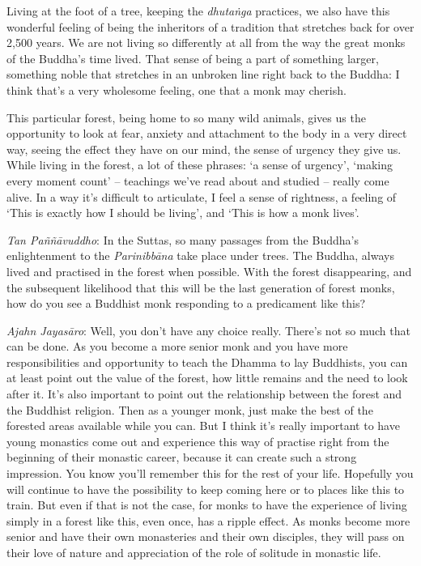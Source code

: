 Living at the foot of a tree, keeping the \emph{dhutaṅga} practices, we
also have this wonderful feeling of being the inheritors of a tradition
that stretches back for over 2,500 years. We are not living so
differently at all from the way the great monks of the Buddha's time
lived. That sense of being a part of something larger, something noble
that stretches in an unbroken line right back to the Buddha: I think
that's a very wholesome feeling, one that a monk may cherish. 

This particular forest, being home to so many wild animals, gives us the
opportunity to look at fear, anxiety and attachment to the body in a
very direct way, seeing the effect they have on our mind, the sense of
urgency they give us. While living in the forest, a lot of these
phrases: `a sense of urgency', `making every moment count' -- teachings
we've read about and studied -- really come alive. In a way it's
difficult to articulate, I feel a sense of rightness, a feeling of `This
is exactly how I should be living', and `This is how a monk lives'. 

\emph{Tan Paññāvuddho}: In the Suttas, so many passages from the
Buddha's enlightenment to the \emph{Parinibbāna} take place under trees. The
Buddha, always lived and practised in the forest when possible. With the
forest disappearing, and the subsequent likelihood that this will be the
last generation of forest monks, how do you see a Buddhist monk
responding to a predicament like this? 

\emph{Ajahn Jayasāro}: Well, you don't have any choice really. There's
not so much that can be done. As you become a more senior monk and you
have more responsibilities and opportunity to teach the Dhamma to lay
Buddhists, you can at least point out the value of the forest, how
little remains and the need to look after it. It's also important to
point out the relationship between the forest and the Buddhist religion. 
Then as a younger monk, just make the best of the forested areas
available while you can. But I think it's really important to have young
monastics come out and experience this way of practise right from the
beginning of their monastic career, because it can create such a strong
impression. You know you'll remember this for the rest of your life. 
Hopefully you will continue to have the possibility to keep coming here
or to places like this to train. But even if that is not the case, for
monks to have the experience of living simply in a forest like this, 
even once, has a ripple effect. As monks become more senior and have
their own monasteries and their own disciples, they will pass on their
love of nature and appreciation of the role of solitude in monastic
life. 

